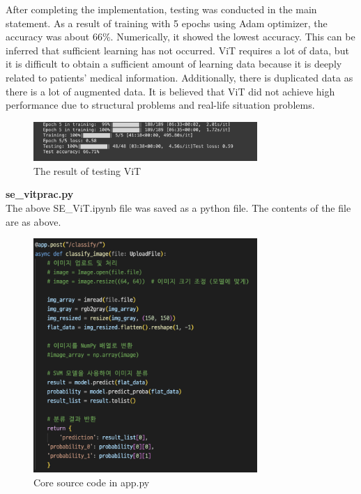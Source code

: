 After completing the implementation, testing was conducted in the main statement. As a result of training with 5 epochs using Adam optimizer, the accuracy was about 66\%. Numerically, it showed the lowest accuracy. This can be inferred that sufficient learning has not occurred. ViT requires a lot of data, but it is difficult to obtain a sufficient amount of learning data because it is deeply related to patients' medical information. Additionally, there is duplicated data as there is a lot of augmented data. It is believed that ViT did not achieve high performance due to structural problems and real-life situation problems.

\begin{figure}[h]
    \centering
    \includegraphics[width=8.5cm]{images/ViT_result.png}
    \caption{The result of testing ViT}
    \label{fig:enter-label}
\end{figure}

\textbf{se\_vitprac.py} \\
The above SE\_ViT.ipynb file was saved as a python file. The contents of the file are as above.

\begin{figure}[h]
    \centering
    \includegraphics[width=8.5cm]{images/app.py.png}
    \caption{Core source code in app.py}
    \label{fig:enter-label}
\end{figure}

